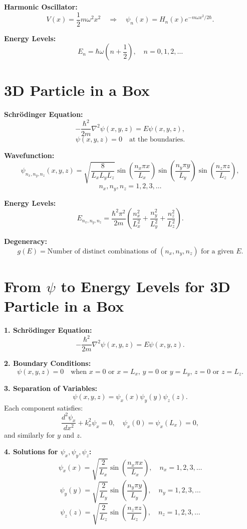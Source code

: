 \documentclass[a4paper,11pt]{article}
\renewcommand{\textbf}[1]{{\scriptsize	\bfseries #1}}
\begin{document}
\begin{footnotesize}
\textbf{Harmonic Oscillator:}
\[
V(x) = \frac{1}{2}m\omega^2x^2 \quad \Rightarrow \quad \psi_n(x) = H_n(x)e^{-m\omega x^2 / 2\hbar}.
\]

\textbf{Energy Levels:}
\[
E_n = \hbar \omega \left(n + \frac{1}{2}\right), \quad n = 0, 1, 2, \dots
\]

\section*{3D Particle in a Box}

\textbf{Schrödinger Equation:}
\[
-\frac{\hbar^2}{2m} \nabla^2 \psi(x, y, z) = E \psi(x, y, z),
\]
\[
\psi(x, y, z) = 0 \quad \text{at the boundaries.}
\]

\textbf{Wavefunction:}
\[
\psi_{n_x, n_y, n_z}(x, y, z) = \sqrt{\frac{8}{L_x L_y L_z}} 
\sin\left(\frac{n_x \pi x}{L_x}\right)
\sin\left(\frac{n_y \pi y}{L_y}\right)
\sin\left(\frac{n_z \pi z}{L_z}\right),
\]
\[
n_x, n_y, n_z = 1, 2, 3, \dots
\]

\textbf{Energy Levels:}
\[
E_{n_x, n_y, n_z} = \frac{\hbar^2 \pi^2}{2m} 
\left(\frac{n_x^2}{L_x^2} + \frac{n_y^2}{L_y^2} + \frac{n_z^2}{L_z^2}\right).
\]

\textbf{Degeneracy:}
\[
g(E) = \text{Number of distinct combinations of } (n_x, n_y, n_z) \text{ for a given } E.
\]


\section*{From \(\psi\) to Energy Levels for 3D Particle in a Box}

\textbf{1. Schrödinger Equation:}
\[
-\frac{\hbar^2}{2m} \nabla^2 \psi(x, y, z) = E \psi(x, y, z).
\]

\textbf{2. Boundary Conditions:}
\[
\psi(x, y, z) = 0 \quad \text{when } x = 0 \text{ or } x = L_x, \, y = 0 \text{ or } y = L_y, \, z = 0 \text{ or } z = L_z.
\]

\textbf{3. Separation of Variables:}
\[
\psi(x, y, z) = \psi_x(x) \psi_y(y) \psi_z(z).
\]
Each component satisfies:
\[
\frac{d^2 \psi_x}{dx^2} + k_x^2 \psi_x = 0, \quad \psi_x(0) = \psi_x(L_x) = 0,
\]
and similarly for \(y\) and \(z\).

\textbf{4. Solutions for \(\psi_x, \psi_y, \psi_z\):}
\[
\psi_x(x) = \sqrt{\frac{2}{L_x}} \sin\left(\frac{n_x \pi x}{L_x}\right), \quad n_x = 1, 2, 3, \dots
\]
\[
\psi_y(y) = \sqrt{\frac{2}{L_y}} \sin\left(\frac{n_y \pi y}{L_y}\right), \quad n_y = 1, 2, 3, \dots
\]
\[
\psi_z(z) = \sqrt{\frac{2}{L_z}} \sin\left(\frac{n_z \pi z}{L_z}\right), \quad n_z = 1, 2, 3, \dots
\]


\end{footnotesize}
\end{document}
